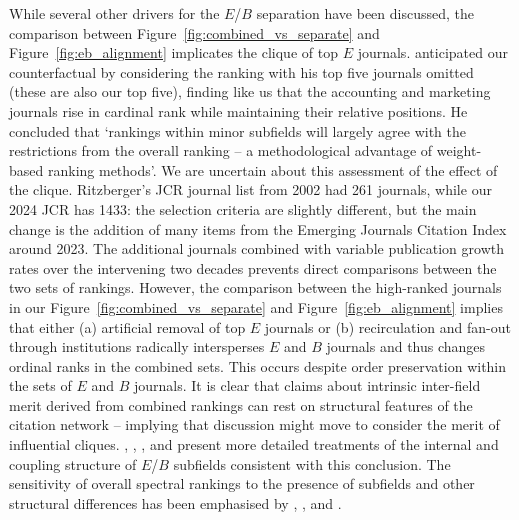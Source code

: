 While several other drivers for the $E$/$B$ separation have been discussed, the comparison between Figure~\ref{fig:combined_vs_separate} and Figure~\ref{fig:eb_alignment} implicates the clique of top $E$ journals. \textcite{ritzbergerRankingJournalsEconomics2008} anticipated our counterfactual by considering the ranking with his top five journals omitted (these are also our top five), finding like us that the accounting and marketing journals rise in cardinal rank while maintaining their relative positions. He concluded that `rankings within minor subfields will largely agree with the restrictions from the overall ranking – a methodological advantage of weight-based ranking methods'. We are uncertain about this assessment of the effect of the clique. Ritzberger's JCR journal list from 2002 had 261 journals, while our 2024 JCR has 1433: the selection criteria are slightly different, but the main change is the addition of many items from the Emerging Journals Citation Index around 2023. The additional journals combined with variable publication growth rates over the intervening two decades prevents direct comparisons between the two sets of rankings. However, the comparison between the high-ranked journals in our Figure~\ref{fig:combined_vs_separate} and Figure~\ref{fig:eb_alignment} implies that either (a) artificial removal of top $E$ journals or (b) recirculation and fan-out through institutions radically intersperses $E$ and $B$ journals and thus changes ordinal ranks in the combined sets. This occurs despite order preservation within the sets of $E$ and $B$ journals. It is clear that claims about intrinsic inter-field merit derived from combined rankings can rest on structural features of the citation network -- implying that discussion might move to consider the merit of influential cliques. \textcite{biehlRelationshipsAcademicBusiness2006}, \textcite{fourcadeSuperiorityEconomists2015}, \textcite{gibsonWhichJournalRankings2014}, \textcite{aistleitnerCitationPatternsEconomics2019} and \textcite{bacciniExploringShapeEconomics2026} present more detailed treatments of the internal and coupling structure of $E$/$B$ subfields consistent with this conclusion.  The sensitivity of overall spectral rankings to the presence of subfields and other structural differences has been emphasised by \textcite{pinskiCitationInfluenceJournal1976}, \textcite{waltmanRelationEigenfactorAudience2010}, \textcite{heilFieldDependentNaturePageRank2023} and \textcite{cavallaroSensitivityCentralityMetrics2024}.

